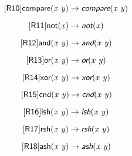 \documentclass[10pt,leqno,fleqn]{article}
\newcommand{\artVariable}[1]{\mbox{\em #1\/}}
\newcommand{\artConstructor}[1]{\mbox{\sf #1}}
\newcommand{\artSpecial}[1]{\mbox{\sf\em #1}}
\begin{document}
\begin{equation}
\tag*{[\artConstructor{\sf R10}]}\artConstructor{\sf compare}(\artVariable{x}\ \artVariable{y})\rightarrow \artSpecial{compare}(\artVariable{x}\ \artVariable{y})
\end{equation}

\begin{equation}
\tag*{[\artConstructor{\sf R11}]}\artConstructor{\sf not}(\artVariable{x})\rightarrow \artSpecial{not}(\artVariable{x})
\end{equation}

\begin{equation}
\tag*{[\artConstructor{\sf R12}]}\artConstructor{\sf and}(\artVariable{x}\ \artVariable{y})\rightarrow \artSpecial{and}(\artVariable{x}\ \artVariable{y})
\end{equation}

\begin{equation}
\tag*{[\artConstructor{\sf R13}]}\artConstructor{\sf or}(\artVariable{x}\ \artVariable{y})\rightarrow \artSpecial{or}(\artVariable{x}\ \artVariable{y})
\end{equation}

\begin{equation}
\tag*{[\artConstructor{\sf R14}]}\artConstructor{\sf xor}(\artVariable{x}\ \artVariable{y})\rightarrow \artSpecial{xor}(\artVariable{x}\ \artVariable{y})
\end{equation}

\begin{equation}
\tag*{[\artConstructor{\sf R15}]}\artConstructor{\sf cnd}(\artVariable{x}\ \artVariable{y})\rightarrow \artSpecial{cnd}(\artVariable{x}\ \artVariable{y})
\end{equation}

\begin{equation}
\tag*{[\artConstructor{\sf R16}]}\artConstructor{\sf lsh}(\artVariable{x}\ \artVariable{y})\rightarrow \artSpecial{lsh}(\artVariable{x}\ \artVariable{y})
\end{equation}

\begin{equation}
\tag*{[\artConstructor{\sf R17}]}\artConstructor{\sf rsh}(\artVariable{x}\ \artVariable{y})\rightarrow \artSpecial{rsh}(\artVariable{x}\ \artVariable{y})
\end{equation}

\begin{equation}
\tag*{[\artConstructor{\sf R18}]}\artConstructor{\sf ash}(\artVariable{x}\ \artVariable{y})\rightarrow \artSpecial{ash}(\artVariable{x}\ \artVariable{y})
\end{equation}
\end{document}
